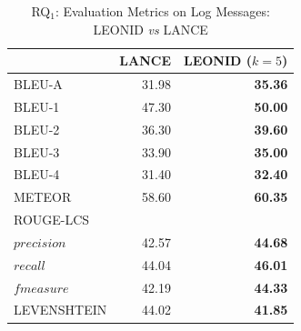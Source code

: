 \begin{table}[h]
	\centering
	\caption{RQ$_1$: Evaluation Metrics on Log Messages: LEONID \emph{vs} LANCE\vspace{-0.2cm}}
	\scriptsize
	\label{tab:log-messages-stats}
	\begin{tabular}{lrr}
		\toprule
		& {\bf LANCE}  &  {\bf LEONID ($k=5$)} \\\midrule
		BLEU-A \cite{papineni2002bleu}& 31.98 & \bf 35.36\\
			\hspace{0.2cm} BLEU-1 & 47.30  & \bf 50.00\\
			\hspace{0.2cm} BLEU-2 & 36.30  & \bf 39.60\\
			\hspace{0.2cm} BLEU-3 & 33.90  & \bf 35.00\\
			\hspace{0.2cm} BLEU-4 & 31.40  & \bf 32.40\\
		METEOR \cite{meteor} & 58.60  & \bf 60.35 \\
		ROUGE-LCS \cite{lin2004rouge} &  \\
		\hspace{0.2cm} $precision$ & 42.57 & \bf 44.68\\
		\hspace{0.2cm} $recall$ & 44.04 &   \bf 46.01\\
		\hspace{0.2cm} $fmeasure$ & 42.19 &  \bf 44.33\\
		LEVENSHTEIN \cite{levenshtein1966} & 44.02 & \bf 41.85 \\\bottomrule
	\end{tabular} 
	\vspace{-0.2cm}
\end{table}

